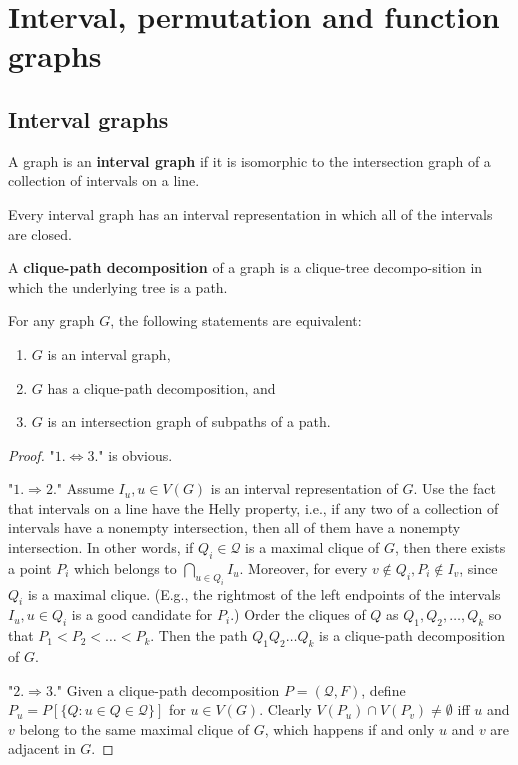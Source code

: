 \chapter{Interval, permutation and function graphs}

\section{Interval graphs}

\begin{defn}
	A graph is an \textbf{interval graph} if it is isomorphic to the intersection graph of a collection of intervals on a line.
\end{defn}

\begin{observ}
	Every interval graph has an interval representation in which all of the intervals are closed.
\end{observ}

\begin{defn}
	A \textbf{clique-path decomposition} of a graph is a clique-tree decompo-\newline sition in which the underlying tree is a path.
\end{defn}

\begin{thm}
	For any graph $G$, the following statements are equivalent:
	
	\begin{enumerate}
		\item $G$ is an interval graph,
		\item $G$ has a clique-path decomposition, and
		\item $G$ is an intersection graph of subpaths of a path.
	\end{enumerate}
\end{thm}

\begin{proof}
	"$1. \Leftrightarrow 3.$" is obvious.
	
	"$1. \Rightarrow 2.$" Assume $I_u , u \in V(G)$ is an interval representation of $G$. Use the fact that intervals on a line have the Helly property, i.e., if any two of a collection of intervals have a nonempty intersection, then all of them have a nonempty intersection. In other words, if $Q_i \in \mathcal{Q}$ is a maximal clique of $G$, then there exists a point $P_i$ which belongs to $\bigcap_{u \in Q_i} I_u$. Moreover, for every $v \notin Q_i , P_i \notin I_v$, since $Q_i$ is a maximal clique. (E.g., the rightmost of the left endpoints of the intervals $I_u , u \in Q_i$ is a good candidate for $P_i$.) Order the cliques of $Q$ as $Q_1, Q_2, \dots, Q_k$ so that $P_1 < P_2 < \dots < P_k$. Then the path
	$Q_1 Q_2 \dots Q_k$ is a clique-path decomposition of $G$.
	
	"$2. \Rightarrow 3.$" Given a clique-path decomposition $P = (\mathcal{Q}, F)$, define $P_u = P [\{Q : u \in Q \in \mathcal{Q}\}]$ for $u \in V(G)$. Clearly $V(P_u) \cap V(P_v) \neq \emptyset$ iff $u$ and $v$ belong to the same maximal clique of $G$, which happens if and only $u$ and $v$ are adjacent in $G$.
\end{proof}

